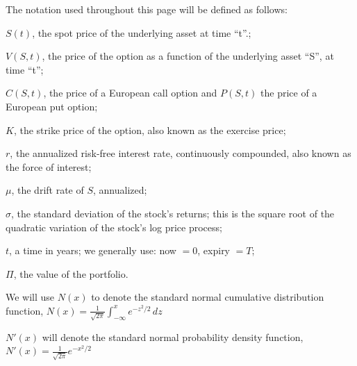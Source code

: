 \documentclass[10pt,landscape]{article}
\begin{document}
\begin{multicols}{3}
 \vspace{0.15cm}

The notation used throughout this page will be defined as follows:

\vspace{0.15cm}

$S(t)$, the spot price of the underlying asset at time ``t''.;
 
\vspace{0.15cm}

$V(S, t)$, the price of the option as a function of the underlying asset ``S'', at time ``t'';
 
\vspace{0.15cm}

$C(S, t)$, the price of a European call option and $P(S, t)$ the price of a European put option;
 
\vspace{0.15cm}

$K$, the strike price of the option, also known as the exercise price;
 
\vspace{0.15cm}

$r$, the annualized risk-free interest rate, continuously compounded, also known as the force of interest;
 
\vspace{0.15cm}

$\mu$, the drift rate of $S$, annualized;
 
\vspace{0.15cm}

$\sigma$, the standard deviation of the stock's returns; this is the square root of the quadratic variation of the stock's log price process;
 
\vspace{0.15cm}

$t$, a time in years; we generally use: now $= 0 $, expiry $ = T $;
 
\vspace{0.15cm}

$\Pi$, the value of the portfolio.
 
\vspace{0.15cm}

We will use $N(x)$ to denote the standard normal cumulative distribution function,
$N(x) = \frac{1}{\sqrt{2\pi}}\int_{-\infty}^x e^{-z^2/2}\, dz$
 
\vspace{0.15cm}

$N'(x)$ will denote the standard normal probability density function,
$N'(x) = \frac{1}{\sqrt{2\pi}} e^{-x^2/2}$
 

\end{multicols}
\end{document}
